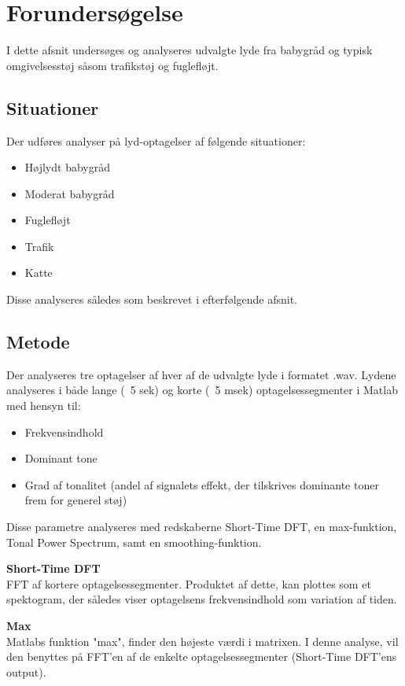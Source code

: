 \section{Forundersøgelse}

I dette afsnit undersøges og analyseres udvalgte lyde fra babygråd og typisk omgivelsesstøj såsom trafikstøj og fuglefløjt.

\subsection*{Situationer}
Der udføres analyser på lyd-optagelser af følgende situationer:
\begin{itemize}
	\item Højlydt babygråd
	\item Moderat babygråd
	\item Fuglefløjt
	\item Trafik
	\item Katte
\end{itemize} 
Disse analyseres således som beskrevet i efterfølgende afsnit.

\subsection{Metode}
Der analyseres tre optagelser af hver af de udvalgte lyde i formatet .wav. Lydene analyseres i både lange (~5 sek) og korte (~5 msek) optagelsessegmenter i Matlab med hensyn til:
\begin{itemize}
	\item Frekvensindhold
	\item Dominant tone
	\item Grad af tonalitet (andel af signalets effekt, der tilskrives dominante toner frem for generel støj) 
\end{itemize} 

Disse parametre analyseres med redskaberne Short-Time DFT, en max-funktion, Tonal Power Spectrum, samt en smoothing-funktion.

\textbf{Short-Time DFT} \\
FFT af kortere optagelsessegmenter. Produktet af dette, kan plottes som et spektogram, der således viser optagelsens frekvensindhold som variation af tiden.

\textbf{Max} \\
Matlabs funktion "max", finder den højeste værdi i matrixen. I denne analyse, vil den benyttes på FFT'en af de enkelte optagelsessegmenter (Short-Time DFT'ens output).

